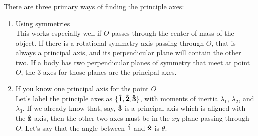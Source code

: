 \documentclass[a4paper]{article}
\begin{document}
There are three primary ways of finding the principle axes:
\begin{enumerate}
	\item Using symmetries\\
		This works especially well if $O$ passes through the center of
		mass of the object. If there is a rotational symmetry axis
		passing through $O$, that is always a principal axis, and its
		perpendicular plane will contain the other two. If a body has
		two perpendicular planes of symmetry that meet at point $O$,
		the 3 axes for those planes are the principal axes.
	\item If you know one principal axis for the point $O$\\
		Let's label the principle axes as
		$\{\boldsymbol{\mathbf{\hat{1}}},\boldsymbol{\mathbf{\hat{2}}},\boldsymbol{\mathbf{\hat{3}}}\}$,
		with moments of inertia $\lambda_1$, $\lambda_2$, and
		$\lambda_3$. If we already know that, say, $\boldsymbol{\mathbf{\hat{3}}}$ is a
		principal axis which is aligned with the $\boldsymbol{\mathbf{\hat{z}}}$ axis,
		then the other two axes must be in the
		$xy$ plane passing through $O$. Let's say that the angle
		between $\boldsymbol{\mathbf{\hat{1}}}$ and $\boldsymbol{\mathbf{\hat{x}}}$ is $\theta$.


\end{enumerate}
\end{document}
